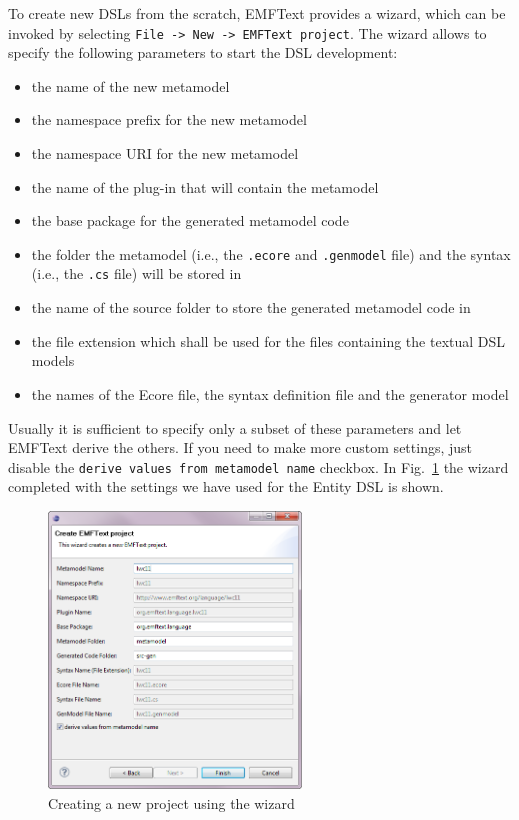 \documentclass[10pt, pdftex]{llncs}
\begin{document}
To create new DSLs from the scratch, EMFText provides a wizard, which can be
invoked by selecting \texttt{File -> New -> EMFText project}. The wizard allows
to specify the following parameters to start the DSL development:

\begin{itemize}
  \item the name of the new metamodel
  \item the namespace prefix for the new metamodel
  \item the namespace URI for the new metamodel
  \item the name of the plug-in that will contain the metamodel
  \item the base package for the generated metamodel code
  \item the folder the metamodel (i.e., the \texttt{.ecore} and
        \texttt{.genmodel} file) and the syntax (i.e., the \texttt{.cs} file)
        will be stored in
  \item the name of the source folder to store the generated metamodel code in
  \item the file extension which shall be used for the files containing the
        textual DSL models
  \item the names of the Ecore file, the syntax definition file and the
        generator model
\end{itemize}

Usually it is sufficient to specify only a subset of these parameters and let
EMFText derive the others. If you need to make more custom settings, just
disable the \texttt{derive values from metamodel name} checkbox. In
Fig.~\ref{fig:newprojectwizard} the wizard completed with the settings we have
used for the Entity DSL is shown.

\begin{figure}
	\centering
	\includegraphics[width=0.60\textwidth]{figures/newprojectwizard.png}
	\caption{Creating a new project using the wizard}
	\label{fig:newprojectwizard}
\end{figure}
\end{document}
